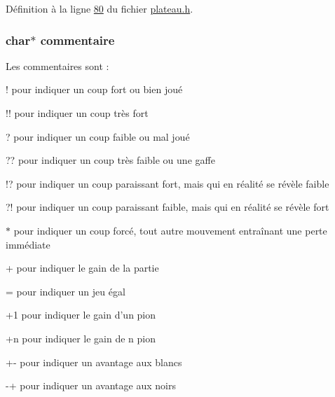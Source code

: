 Définition à la ligne \hyperlink{plateau_8h_source_l00080}{80} du fichier \hyperlink{plateau_8h_source}{plateau.h}.

\hypertarget{structcoup_a8978a8d22b339f32c70e5cb900d4c961}{
\subsubsection[{commentaire}]{\setlength{\rightskip}{0pt plus 5cm}char$\ast$ {\bf commentaire}}}
\label{structcoup_a8978a8d22b339f32c70e5cb900d4c961}
Les commentaires sont :\par
 \begin{DoxyItemize}
\item ! pour indiquer un coup fort ou bien joué\par
 \item !! pour indiquer un coup très fort\par
 \item ? pour indiquer un coup faible ou mal joué\par
 \item ?? pour indiquer un coup très faible ou une gaffe\par
 \item !? pour indiquer un coup paraissant fort, mais qui en réalité se révèle faible\par
 \item ?! pour indiquer un coup paraissant faible, mais qui en réalité se révèle fort\par
 \item $\ast$ pour indiquer un coup forcé, tout autre mouvement entraînant une perte immédiate\par
 \item + pour indiquer le gain de la partie\par
 \item = pour indiquer un jeu égal\par
 \item +1 pour indiquer le gain d’un pion\par
 \item +n pour indiquer le gain de n pion\par
 \item +-\/ pour indiquer un avantage aux blancs\par
 \item -\/+ pour indiquer un avantage aux noirs \end{DoxyItemize}



